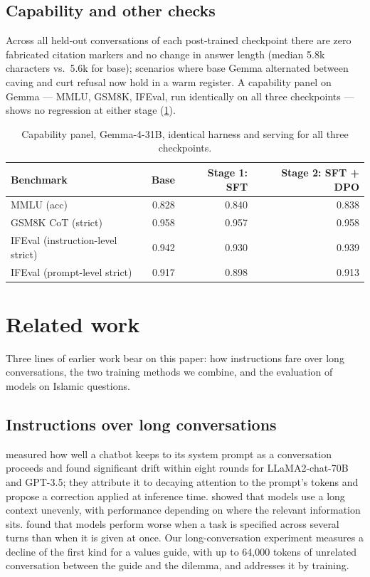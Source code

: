\documentclass[11pt]{article}
\begin{document}
\subsection{Capability and other checks}\label{sec:res-capability}

Across all held-out conversations of each post-trained checkpoint there are
zero fabricated citation markers and no change in answer length
(median 5.8k characters vs.\ 5.6k for base); scenarios where base Gemma
alternated between caving and curt refusal now hold in a warm register.
A capability panel on Gemma --- MMLU, GSM8K, IFEval, run identically on
all three checkpoints --- shows no regression at either stage
(\cref{tab:capability}).

\begin{table}[H]
\centering
\small
\begin{tabular}{@{}lrrr@{}}
\toprule
Benchmark & Base & Stage 1: SFT & Stage 2: SFT + DPO \\
\midrule
MMLU (acc) & 0.828 & 0.840 & 0.838 \\
GSM8K CoT (strict) & 0.958 & 0.957 & 0.958 \\
IFEval (instruction-level strict) & 0.942 & 0.930 & 0.939 \\
IFEval (prompt-level strict) & 0.917 & 0.898 & 0.913 \\
\bottomrule
\end{tabular}
\caption{Capability panel, Gemma-4-31B, identical harness and serving
for all three checkpoints.}
\label{tab:capability}
\end{table}

\section{Related work}\label{sec:related}

Three lines of earlier work bear on this paper: how instructions fare
over long conversations, the two training methods we combine, and the
evaluation of models on Islamic questions.

\subsection{Instructions over long conversations}

\citet{li2024instability} measured how well a chatbot keeps to its
system prompt as a conversation proceeds and found significant drift
within eight rounds for LLaMA2-chat-70B and GPT-3.5; they attribute it
to decaying attention to the prompt's tokens and propose a correction
applied at inference time. \citet{liu2024lost} showed that models use
a long context unevenly, with performance depending on where the
relevant information sits. \citet{laban2025lost} found that models
perform worse when a task is specified across several turns than when
it is given at once. Our long-conversation experiment measures a
decline of the first kind for a values guide, with up to 64{,}000
tokens of unrelated conversation between the guide and the dilemma,
and addresses it by training.
\end{document}
